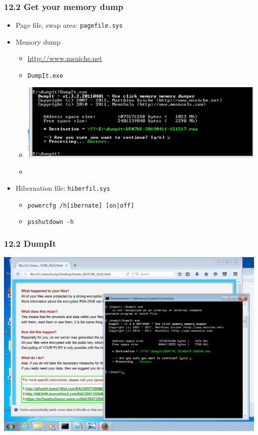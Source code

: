 \begin{frame}
  \frametitle{12.2 Get your memory dump}
    \begin{itemize}
        \item Page file, swap area: \texttt{pagefile.sys}
        \item Memory dump
            \begin{itemize}
		    \item[] \url{http://www.msuiche.net}
		    \item[] \texttt{DumpIt.exe}
                    \item[] \includegraphics[scale=0.5]{images/f12_dumpit.png}
		    \item[] 
            \end{itemize}
        \item Hibernation file: \texttt{hiberfil.sys}
            \begin{itemize}
		    \item[] \texttt{powercfg /h[ibernate] [on|off]}
		    \item[] \texttt{psshutdown -h}
            \end{itemize}
    \end{itemize}
\end{frame}


\begin{frame}
  \frametitle{12.2 DumpIt}
  \includegraphics[scale=0.2]{images/f11_memdump.png}
\end{frame}

